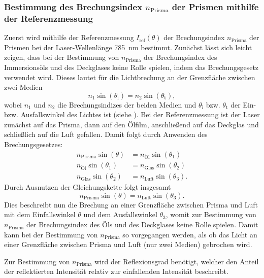 \subsubsection*{Bestimmung des Brechungsindex $n_{\mathrm{Prisma}}$ der Prismen mithilfe der Referenzmessung}\label{subsubsec:referenz}
Zuerst wird mithilfe der Referenzmessung $I_{\mathrm{ref}}(\theta)$ der Brechungsindex $n_{\mathrm{Prisma}}$ der Prismen bei der Laser-Wellenlänge \SI{785}{\nm}
bestimmt. Zunächst lässt sich leicht zeigen, dass bei der Bestimmung von $n_{\mathrm{Prisma}}$ der Brechungsindex des Immersionsöls und des Deckglases keine Rolle spielen,
indem das Brechungsgesetz verwendet wird. Dieses lautet für die Lichtbrechung an der Grenzfläche zwischen zwei Medien
\begin{equation*}
    n_1 \sin(\theta_{\mathrm{i}}) = n_2 \sin(\theta_{\mathrm{t}}),
\end{equation*} wobei $n_1$ und $n_2$ die Brechungsindizes der beiden Medien und $\theta_{\mathrm{i}}$ bzw. $\theta_{\mathrm{t}}$ der Ein- bzw. Ausfallswinkel des Lichtes
ist (siehe \cite{linden_optik}). Bei der Referenzmessung ist der Laser zunächst auf das Prisma, dann auf den Ölfilm, anschließend auf das Deckglas und schließlich auf die Luft
gefallen. Damit folgt durch Anwenden des Brechungsgesetzes:
\begin{align*}
    n_{\mathrm{Prisma}} \sin(\theta) &= n_{\mathrm{\ddot Ol}} \sin(\theta_1) \\
    n_{\mathrm{\ddot Ol}} \sin(\theta_1) &= n_{\mathrm{Glas}} \sin(\theta_2) \\
    n_{\mathrm{Glas}} \sin(\theta_2) &= n_{\mathrm{Luft}} \sin(\theta_3) .
\end{align*} Durch Ausnutzen der Gleichungskette folgt insgesamt
\begin{equation*}
    n_{\mathrm{Prisma}} \sin(\theta) = n_{\mathrm{Luft}} \sin(\theta_3) .
\end{equation*} Dies beschreibt nun die Brechung an einer Grenzfläche zwischen Prisma und Luft mit dem Einfallswinkel $\theta$ und dem Ausfallswinkel $\theta_3$, womit
zur Bestimmung von $n_{\mathrm{Prisma}}$ der Brechungsindex des Öls und des Deckglases keine Rolle spielen. Damit kann bei der Bestimmung von $n_{\mathrm{Prisma}}$
so vorgegangen werden, als ob das Licht an einer Grenzfläche zwischen Prisma und Luft (nur zwei Medien) gebrochen wird.\par
Zur Bestimmung von $n_{\mathrm{Prisma}}$ wird der Reflexionsgrad benötigt, welcher den Anteil der reflektierten Intensität relativ zur einfallenden Intensität beschreibt.
